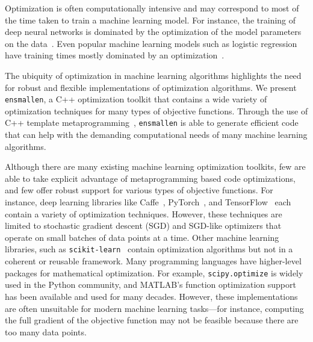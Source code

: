 \documentclass{article}
\begin{document}
Optimization is often computationally intensive and may correspond
to most of the time taken to train a machine learning model.  For instance, the
training of deep neural networks is dominated by the optimization of the model
parameters on the data~\cite{schmidhuber2015deep}.
Even popular machine learning models such as logistic regression
have training times mostly dominated by an optimization~\cite{kingma2015adam}.
%

The ubiquity of optimization in machine learning algorithms highlights the need
for robust and flexible implementations of optimization algorithms.
We present {\tt ensmallen}, a C++ optimization toolkit
that contains a wide variety of optimization techniques for many types of
objective functions.  Through the use of C++ template metaprogramming~\cite{TODO},
{\tt ensmallen} is able to generate efficient code that can help with the
demanding computational needs of many machine learning algorithms.

Although there are many existing machine learning optimization toolkits, few
are able to take explicit advantage of metaprogramming based code optimizations,
and few offer robust support for various types of objective functions.
For instance, deep learning
libraries like Caffe~\cite{jia2014caffe},
PyTorch~\cite{paszke2017automatic},
and TensorFlow~\cite{abadi2016tensorflow}
each contain a variety of optimization techniques.  However, these techniques are
limited to stochastic gradient descent (SGD) and SGD-like optimizers that
operate on small batches of data points at a time.  Other machine learning
libraries, such as {\tt scikit-learn}~\cite{pedregosa2011scikit}
contain optimization algorithms but not in a coherent or reusable framework.
Many programming languages have higher-level packages for
mathematical optimization.  For example, {\tt scipy.optimize} %
is widely used in the Python community, and MATLAB's function optimization
support has been available and used for many decades.  However, these
implementations are often unsuitable for modern machine learning tasks---for
instance, computing the full gradient of the objective function may not be
feasible because there are too many data points.
\end{document}
